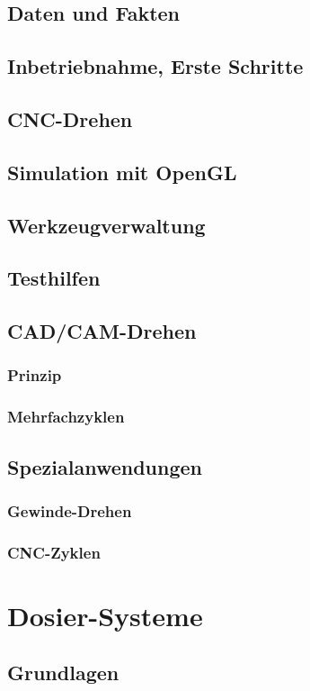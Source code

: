 \documentclass[14pt,a4paper]{book}
\begin{document}
	\section{Daten und Fakten} 
	\section{Inbetriebnahme, Erste Schritte} 
	\section{CNC-Drehen} 
	\section{Simulation mit OpenGL} 
	\section{Werkzeugverwaltung} 
	\section{Testhilfen} 
	\section{CAD/CAM-Drehen} 
		\subsection{Prinzip} 
		\subsection{Mehrfachzyklen} 
	\section{Spezialanwendungen} 
		\subsection{Gewinde-Drehen} 
		\subsection{CNC-Zyklen} 
 
\chapter{Dosier-Systeme}
	\section{Grundlagen} 
\end{document}

